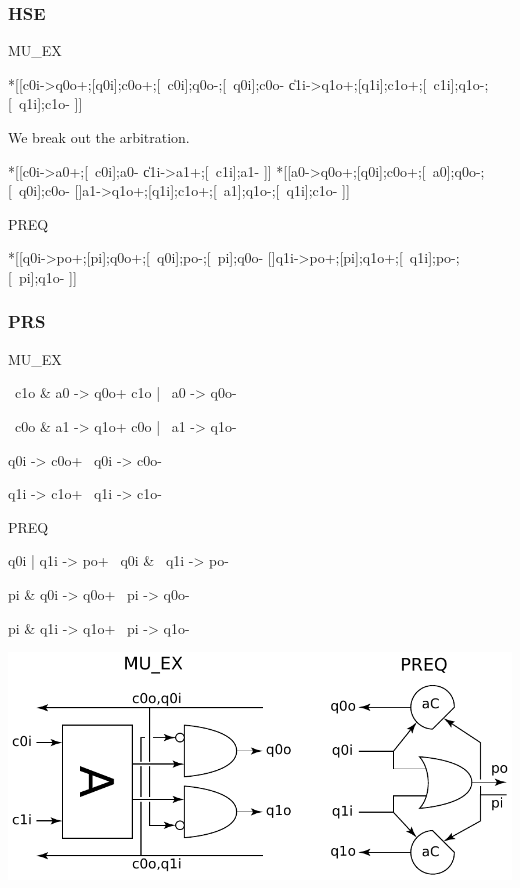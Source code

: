 \documentclass[aer.tex]{subfiles}
\begin{document}
\subsubsection*{HSE}

MU\_EX
\begin{hse}
*[[c0i->q0o+;[q0i];c0o+;[~c0i];q0o-;[~q0i];c0o-
  \|c1i->q1o+;[q1i];c1o+;[~c1i];q1o-;[~q1i];c1o-
 ]]
\end{hse}

We break out the arbitration.

\begin{hse}
*[[c0i->a0+;[~c0i];a0-
  \|c1i->a1+;[~c1i];a1-
 ]]
*[[a0->q0o+;[q0i];c0o+;[~a0];q0o-;[~q0i];c0o-
  []a1->q1o+;[q1i];c1o+;[~a1];q1o-;[~q1i];c1o-
 ]]
\end{hse}

\noindent PREQ

\begin{hse}
*[[q0i->po+;[pi];q0o+;[~q0i];po-;[~pi];q0o-
  []q1i->po+;[pi];q1o+;[~q1i];po-;[~pi];q1o-
 ]]
\end{hse}

\subsubsection*{PRS}

MU\_EX

\begin{prs2}
~c1o & a0 -> q0o+
c1o | ~a0 -> q0o-

~c0o & a1 -> q1o+
c0o | ~a1 -> q1o-
\end{prs2}

\begin{prs2}
q0i -> c0o+
~q0i -> c0o-

q1i -> c1o+
~q1i -> c1o-
\end{prs2}

\noindent PREQ

\begin{prs2}
q0i | q1i -> po+
~q0i & ~q1i -> po-
\end{prs2}

\begin{prs2}
pi & q0i -> q0o+
~pi -> q0o-

pi & q1i -> q1o+
~pi -> q1o-
\end{prs2}

\begin{center}
  \includegraphics[width=.7\textwidth]{img/standardnwayarbiter.pdf}
\end{center}
\end{document}
